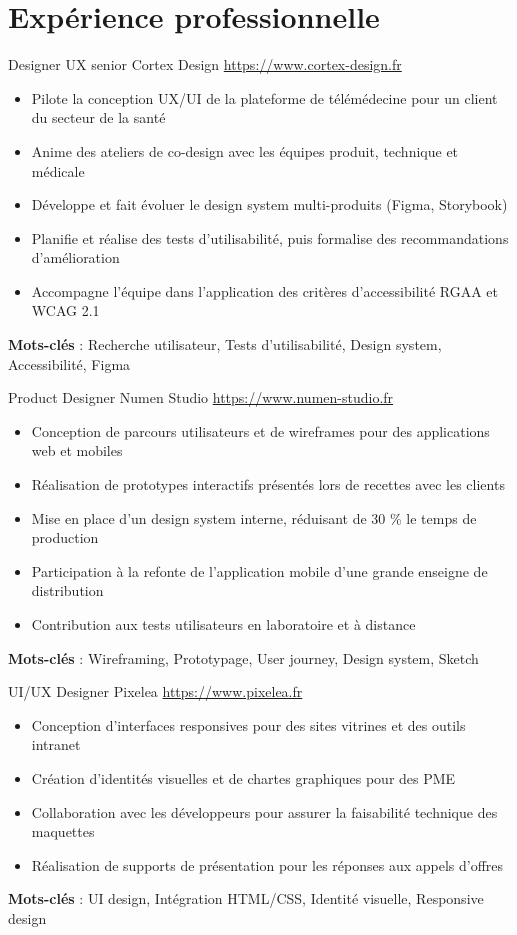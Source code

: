 \documentclass[a4paper, serif, 10pt]{moderncv}
\begin{document}
\section{Expérience professionnelle}

        {Designer UX senior}
        {Cortex Design}
        {\url{https://www.cortex-design.fr}}
        {}
        {\begin{itemize}
\item Pilote la conception UX/UI de la plateforme de télémédecine pour un client du secteur de la santé
\item Anime des ateliers de co-design avec les équipes produit, technique et médicale
\item Développe et fait évoluer le design system multi-produits (Figma, Storybook)
\item Planifie et réalise des tests d'utilisabilité, puis formalise des recommandations d'amélioration
\item Accompagne l'équipe dans l'application des critères d'accessibilité RGAA et WCAG 2.1
\end{itemize}
\textbf{Mots-clés} : Recherche utilisateur, Tests d'utilisabilité, Design system, Accessibilité, Figma}

        {Product Designer}
        {Numen Studio}
        {\url{https://www.numen-studio.fr}}
        {}
        {\begin{itemize}
\item Conception de parcours utilisateurs et de wireframes pour des applications web et mobiles
\item Réalisation de prototypes interactifs présentés lors de recettes avec les clients
\item Mise en place d'un design system interne, réduisant de 30 \% le temps de production
\item Participation à la refonte de l'application mobile d'une grande enseigne de distribution
\item Contribution aux tests utilisateurs en laboratoire et à distance
\end{itemize}
\textbf{Mots-clés} : Wireframing, Prototypage, User journey, Design system, Sketch}

        {UI/UX Designer}
        {Pixelea}
        {\url{https://www.pixelea.fr}}
        {}
        {\begin{itemize}
\item Conception d'interfaces responsives pour des sites vitrines et des outils intranet
\item Création d'identités visuelles et de chartes graphiques pour des PME
\item Collaboration avec les développeurs pour assurer la faisabilité technique des maquettes
\item Réalisation de supports de présentation pour les réponses aux appels d'offres
\end{itemize}
\textbf{Mots-clés} : UI design, Intégration HTML/CSS, Identité visuelle, Responsive design}
\end{document}
